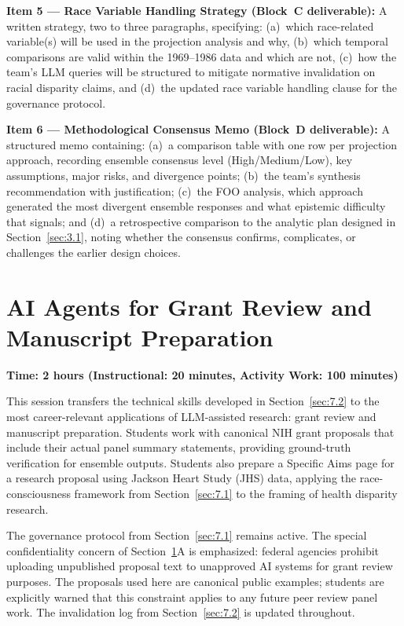\textbf{Item 5 --- Race Variable Handling Strategy (Block~C
deliverable):}
A written strategy, two to three paragraphs, specifying: (a)~which
race-related variable(s) will be used in the projection analysis
and why, (b)~which temporal comparisons are valid within the
1969--1986 data and which are not, (c)~how the team's LLM queries
will be structured to mitigate normative invalidation on racial
disparity claims, and (d)~the updated race variable handling clause
for the governance protocol.

\textbf{Item 6 --- Methodological Consensus Memo (Block~D
deliverable):}
A structured memo containing: (a)~a comparison table with one
row per projection approach, recording ensemble consensus level
(High/Medium/Low), key assumptions, major risks, and divergence
points; (b)~the team's synthesis recommendation with justification;
(c)~the FOO analysis, which approach generated the most divergent
ensemble responses and what epistemic difficulty that signals;
and (d)~a retrospective comparison to the analytic plan designed
in Section~\ref{sec:3.1}, noting whether the consensus confirms,
complicates, or challenges the earlier design choices.

\section{AI Agents for Grant Review and Manuscript Preparation}
\label{sec:7.3}

\textbf{Time: 2 hours (Instructional: 20 minutes, Activity Work:
100 minutes)}

This session transfers the technical skills developed in
Section~\ref{sec:7.2} to the most career-relevant applications
of LLM-assisted research: grant review and manuscript preparation.
Students work with canonical NIH grant proposals that include
their actual panel summary statements, providing ground-truth
verification for ensemble outputs. Students also prepare a
Specific Aims page for a research proposal using Jackson Heart
Study (JHS) data, applying the race-consciousness framework from
Section~\ref{sec:7.1} to the framing of health disparity research.

The governance protocol from Section~\ref{sec:7.1} remains active.
The special confidentiality concern of Section~\ref{sec:7.3}A is
emphasized: federal agencies prohibit uploading unpublished
proposal text to unapproved AI systems for grant review purposes.
The proposals used here are canonical public examples; students
are explicitly warned that this constraint applies to any future
peer review panel work. The invalidation log from
Section~\ref{sec:7.2} is updated throughout.

